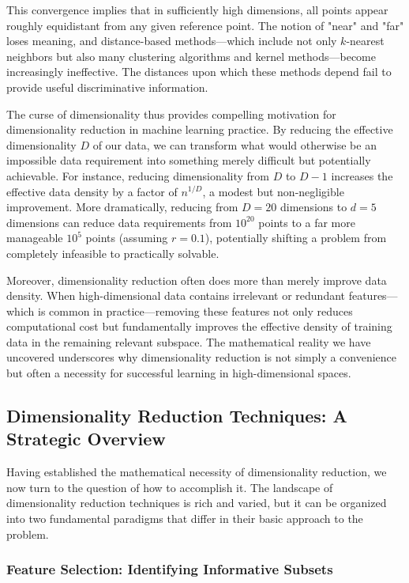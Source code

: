 This convergence implies that in sufficiently high dimensions, all points appear roughly equidistant from any given reference point. The notion of "near" and "far" loses meaning, and distance-based methods—which include not only $k$-nearest neighbors but also many clustering algorithms and kernel methods—become increasingly ineffective. The distances upon which these methods depend fail to provide useful discriminative information.

The curse of dimensionality thus provides compelling motivation for dimensionality reduction in machine learning practice. By reducing the effective dimensionality $D$ of our data, we can transform what would otherwise be an impossible data requirement into something merely difficult but potentially achievable. For instance, reducing dimensionality from $D$ to $D-1$ increases the effective data density by a factor of $n^{1/D}$, a modest but non-negligible improvement. More dramatically, reducing from $D = 20$ dimensions to $d = 5$ dimensions can reduce data requirements from $10^{20}$ points to a far more manageable $10^5$ points (assuming $r = 0.1$), potentially shifting a problem from completely infeasible to practically solvable.

Moreover, dimensionality reduction often does more than merely improve data density. When high-dimensional data contains irrelevant or redundant features—which is common in practice—removing these features not only reduces computational cost but fundamentally improves the effective density of training data in the remaining relevant subspace. The mathematical reality we have uncovered underscores why dimensionality reduction is not simply a convenience but often a necessity for successful learning in high-dimensional spaces.

\subsection*{Dimensionality Reduction Techniques: A Strategic Overview}

Having established the mathematical necessity of dimensionality reduction, we now turn to the question of how to accomplish it. The landscape of dimensionality reduction techniques is rich and varied, but it can be organized into two fundamental paradigms that differ in their basic approach to the problem.

\subsubsection*{Feature Selection: Identifying Informative Subsets}


